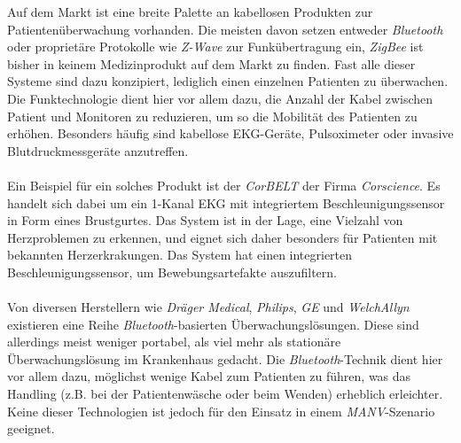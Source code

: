Auf dem Markt ist eine breite Palette an kabellosen Produkten zur Patientenüberwachung vorhanden. Die meisten davon setzen
entweder \emph{Bluetooth} oder proprietäre Protokolle wie \emph{Z-Wave} zur Funkübertragung ein, \emph{ZigBee} ist bisher in
keinem Medizinprodukt auf dem Markt zu finden. Fast alle dieser Systeme sind dazu konzipiert, lediglich einen einzelnen 
Patienten zu überwachen. Die Funktechnologie dient hier vor allem dazu, die Anzahl der Kabel zwischen Patient und Monitoren 
zu reduzieren, um so die Mobilität des Patienten zu erhöhen. Besonders häufig sind kabellose EKG-Geräte, Pulsoximeter oder 
invasive Blutdruckmessgeräte anzutreffen. \\
\\             
Ein Beispiel für ein solches Produkt ist der \emph{CorBELT} der Firma \emph{Corscience}. Es handelt sich dabei
um ein 1-Kanal EKG mit integriertem Beschleunigungssensor in Form eines Brustgurtes. Das System ist in der
Lage, eine Vielzahl von Herzproblemen zu erkennen, und 
eignet sich daher besonders für Patienten mit bekannten
Herzerkrakungen. Das System hat einen integrierten Beschleunigungssensor, um Bewebungsartefakte auszufiltern.
\\
\\
Von diversen Herstellern wie \emph{Dräger Medical}, \emph{Philips}, \emph{GE} und \emph{WelchAllyn} existieren eine 
Reihe \emph{Bluetooth}-basierten Überwachungslösungen. Diese sind allerdings meist weniger portabel, als viel mehr
als stationäre Überwachungslösung im Krankenhaus gedacht. Die \emph{Bluetooth}-Technik dient hier vor allem dazu, 
möglichst wenige Kabel zum Patienten zu führen, was das Handling (z.B. bei der Patientenwäsche oder beim Wenden)
erheblich erleichter. Keine dieser Technologien ist jedoch für den Einsatz in einem \emph{MANV}-Szenario
geeignet.
       

